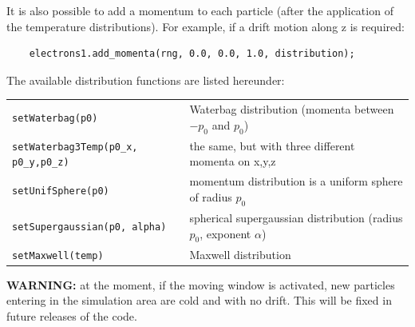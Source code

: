 \documentclass[11pt,a4paper]{report}
\begin{document}
It is also possible to add a momentum to each particle (after the application of the temperature distributions). For example, if a drift motion along z is required:
\begin{lstlisting}
	electrons1.add_momenta(rng, 0.0, 0.0, 1.0, distribution);
\end{lstlisting}
The available distribution functions are listed hereunder:
\begin{center}
    \begin{tabular}{ l | l }
    	\verb+setWaterbag(p0)+ & Waterbag distribution (momenta between $-p_0$ and $p_0$)\\
    	\verb+setWaterbag3Temp(p0_x, p0_y,p0_z)+ & the same, but with three different momenta on x,y,z\\
    	\verb+setUnifSphere(p0)+ & momentum distribution is a uniform sphere of radius $p_0$\\
    	\verb+setSupergaussian(p0, alpha)+ & spherical supergaussian distribution (radius $p_0$, exponent $\alpha$)\\
    	\verb+setMaxwell(temp)+ & Maxwell distribution \\
    \end{tabular}
\end{center}
\textbf{WARNING: } at the moment, if the moving window is activated, new particles entering in the simulation area are cold and with no drift. This will be fixed in future releases of the code.
\end{document}
